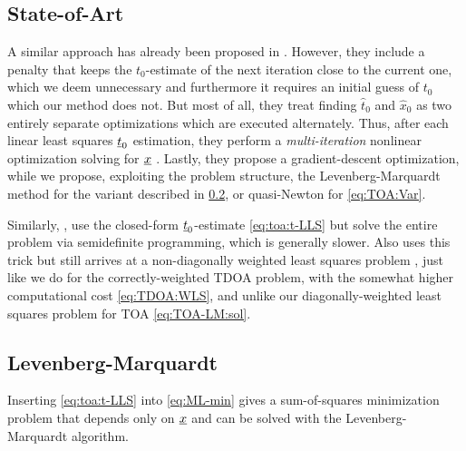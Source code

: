 \documentclass[conference]{IEEEtran}
\begin{document}
\subsection{State-of-Art} 
\label{sec:TOA:state-of-art}
A similar approach has already been proposed in 
\cite[Eq.~8+10]{Chen2020_ANovelMethodForAsynchronousTimeOfArrivalBasedSourceLocalizationAlgorithmsPerformanceAndComplexity}. 
However, they include a penalty that keeps the $t_0$-estimate of the next iteration close to the current one, which we deem unnecessary and furthermore it requires an initial guess of $t_0$ which our method does not. But most of all, they treat finding $\hat t_0$ and $\hat x_0$ as two entirely separate optimizations which are executed alternately. Thus, after each linear least squares ${\underline{t}}_0$ estimation, they perform a \emph{multi-iteration} nonlinear optimization solving for ${\underline{x}}$
\cite[Alg.~1]{Chen2020_ANovelMethodForAsynchronousTimeOfArrivalBasedSourceLocalizationAlgorithmsPerformanceAndComplexity}. Lastly, they propose a gradient-descent optimization, while we propose, exploiting the problem structure, the Levenberg-Marquardt method for the variant described in \cref{eq:TOA:LM}, or quasi-Newton for \cref{eq:TOA:Var}. 

Similarly, 
\cite[Eq.~4]{Zou2016_AsynchronousTimeOfArrivalBasedSourceLocalizationWithSensorPositionUncertainties}, 
\cite{Xu2011_SourceLocalizationInWirelessSensorNetworksFromSignalTimeOfArrivalMeasurements}
use the closed-form ${\underline{t}}_0$-estimate \cref{eq:toa:t-LLS} but solve the entire problem via semidefinite programming, which is generally slower. 
Also \cite[Eq.~6]{Zou2022_FixedPointIterationBasedAlgorithmForAsynchronousTOABasedSourceLocalization} uses this trick but still arrives at a non-diagonally weighted least squares problem 
\cite[Eq.~7+A7]{Zou2022_FixedPointIterationBasedAlgorithmForAsynchronousTOABasedSourceLocalization}, 
just like we do for the correctly-weighted \ac{TDOA} problem, with the somewhat higher computational cost \cref{eq:TDOA:WLS}, and unlike our diagonally-weighted least squares problem for \ac{TOA} \cref{eq:TOA-LM:sol}. 


%
%
\subsection{Levenberg-Marquardt}
\label{eq:TOA:LM}
Inserting \cref{eq:toa:t-LLS} into \cref{eq:ML-min} gives a sum-of-squares minimization problem that depends only on ${\underline{x}}$ and can be solved with the Levenberg-Marquardt algorithm. 
\end{document}
